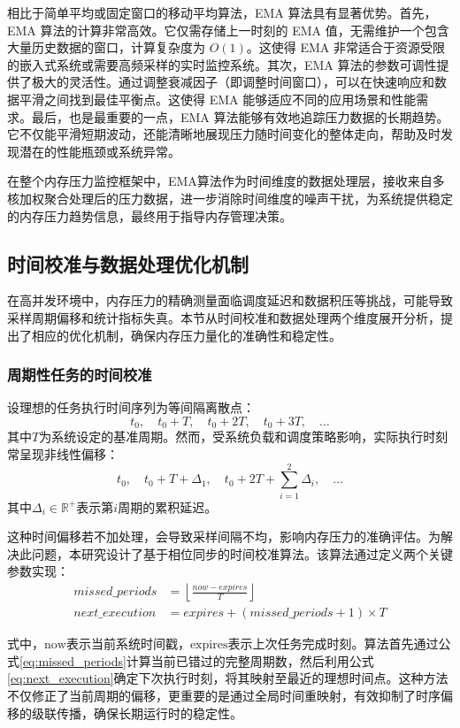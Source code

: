 相比于简单平均或固定窗口的移动平均算法，EMA 算法具有显著优势。首先，EMA 算法的计算非常高效。它仅需存储上一时刻的 EMA 值，无需维护一个包含大量历史数据的窗口，计算复杂度为 \(O(1)\)。这使得 EMA 非常适合于资源受限的嵌入式系统或需要高频采样的实时监控系统。其次，EMA 算法的参数可调性提供了极大的灵活性。通过调整衰减因子（即调整时间窗口），可以在快速响应和数据平滑之间找到最佳平衡点。这使得 EMA 能够适应不同的应用场景和性能需求。最后，也是最重要的一点，EMA 算法能够有效地追踪压力数据的长期趋势。它不仅能平滑短期波动，还能清晰地展现压力随时间变化的整体走向，帮助及时发现潜在的性能瓶颈或系统异常。

在整个内存压力监控框架中，EMA算法作为时间维度的数据处理层，接收来自多核加权聚合处理后的压力数据，进一步消除时间维度的噪声干扰，为系统提供稳定的内存压力趋势信息，最终用于指导内存管理决策。

\subsection{时间校准与数据处理优化机制}
\label{sec:time_calibration_and_data_processing}
在高并发环境中，内存压力的精确测量面临调度延迟和数据积压等挑战，可能导致采样周期偏移和统计指标失真。本节从时间校准和数据处理两个维度展开分析，提出了相应的优化机制，确保内存压力量化的准确性和稳定性。

\subsubsection{周期性任务的时间校准}

设理想的任务执行时间序列为等间隔离散点：
\[
t_0, \quad t_0 + T, \quad t_0 + 2T, \quad t_0 + 3T, \quad \dots
\]
其中\(T\)为系统设定的基准周期。然而，受系统负载和调度策略影响，实际执行时刻常呈现非线性偏移：
\[
t_0, \quad t_0 + T + \Delta_1, \quad t_0 + 2T + \sum_{i=1}^2\Delta_i, \quad \dots
\]
其中\(\Delta_i \in \mathbb{R}^+\)表示第\(i\)周期的累积延迟。

这种时间偏移若不加处理，会导致采样间隔不均，影响内存压力的准确评估。为解决此问题，本研究设计了基于相位同步的时间校准算法。该算法通过定义两个关键参数实现：
\begin{align}
    \mathit{missed\_periods} &= \left\lfloor \frac{\mathit{now} - \mathit{expires}}{T} \right\rfloor \label{eq:missed_periods} \\
    \mathit{next\_execution} &= \mathit{expires} + (\mathit{missed\_periods} + 1) \times T \label{eq:next_execution}
\end{align}

式中，\(\text{now}\)表示当前系统时间戳，\(\text{expires}\)表示上次任务完成时刻。算法首先通过公式\ref{eq:missed_periods}计算当前已错过的完整周期数，然后利用公式\ref{eq:next_execution}确定下次执行时刻，将其映射至最近的理想时间点。这种方法不仅修正了当前周期的偏移，更重要的是通过全局时间重映射，有效抑制了时序偏移的级联传播，确保长期运行时的稳定性。

